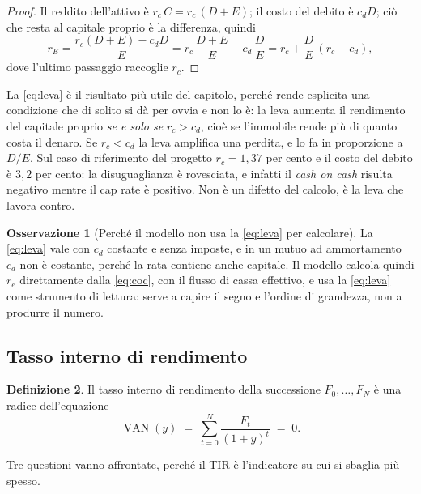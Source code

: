 \documentclass[11pt,a4paper]{article}
\theoremstyle{definition}
\newtheorem{definizione}{Definizione}[section]
\newtheorem{osservazione}[definizione]{Osservazione}
\theoremstyle{plain}
\DeclareMathOperator{\VAN}{VAN}
\begin{document}
\begin{proof}
Il reddito dell'attivo è $r_c\,C = r_c\,(D+E)$; il costo del debito è $c_d D$; ciò che resta al capitale proprio è la differenza, quindi
\[
r_E = \frac{r_c(D+E) - c_d D}{E} = r_c\,\frac{D+E}{E} - c_d\,\frac{D}{E}
= r_c + \frac{D}{E}\,(r_c - c_d),
\]
dove l'ultimo passaggio raccoglie $r_c$.
\end{proof}

La \eqref{eq:leva} è il risultato più utile del capitolo, perché rende esplicita una condizione che di solito si dà per ovvia e non lo è: la leva aumenta il rendimento del capitale proprio \emph{se e solo se} $r_c > c_d$, cioè se l'immobile rende più di quanto costa il denaro. Se $r_c < c_d$ la leva amplifica una perdita, e lo fa in proporzione a $D/E$. Sul caso di riferimento del progetto $r_c = 1{,}37$ per cento e il costo del debito è $3{,}2$ per cento: la disuguaglianza è rovesciata, e infatti il \emph{cash on cash} risulta negativo mentre il cap rate è positivo. Non è un difetto del calcolo, è la leva che lavora contro.

\begin{osservazione}[Perché il modello non usa la \eqref{eq:leva} per calcolare]
La \eqref{eq:leva} vale con $c_d$ costante e senza imposte, e in un mutuo ad ammortamento $c_d$ non è costante, perché la rata contiene anche capitale. Il modello calcola quindi $r_e$ direttamente dalla \eqref{eq:coc}, con il flusso di cassa effettivo, e usa la \eqref{eq:leva} come strumento di lettura: serve a capire il segno e l'ordine di grandezza, non a produrre il numero.
\end{osservazione}

\subsection{Tasso interno di rendimento}

\begin{definizione}
Il tasso interno di rendimento della successione $F_0,\dots,F_N$ è una radice dell'equazione
\begin{equation}
\VAN(y) \;=\; \sum_{t=0}^{N} \frac{F_t}{(1+y)^t} \;=\; 0 .
\label{eq:tir}
\end{equation}
\end{definizione}

Tre questioni vanno affrontate, perché il TIR è l'indicatore su cui si sbaglia più spesso.
\end{document}
